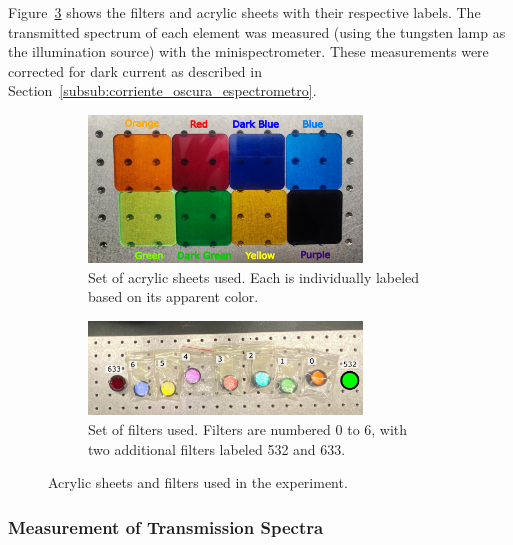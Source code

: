 \noindent Figure~\ref{fig:laminas_filtros} shows the filters and acrylic sheets with their respective labels. The transmitted spectrum of each element was measured (using the tungsten lamp as the illumination source) with the minispectrometer. These measurements were corrected for dark current as described in Section~\ref{subsub:corriente_oscura_espectrometro}.

\begin{figure}[H]
    \centering
    \begin{subfigure}{\textwidth}
        \centering
        \includegraphics[width=0.8\textwidth]{Figures/C3/laminas.pdf}
        \caption{Set of acrylic sheets used. Each is individually labeled based on its apparent color.}
        \label{fig:laminas}
    \end{subfigure}
    \vspace{1em}
    \begin{subfigure}{\textwidth}
        \centering
        \includegraphics[width=0.8\textwidth]{Figures/C3/filtros.pdf}
        \caption{Set of filters used. Filters are numbered 0 to 6, with two additional filters labeled 532 and 633.}
        \label{fig:filtros}
    \end{subfigure}
    \caption{Acrylic sheets and filters used in the experiment.}
    \label{fig:laminas_filtros}
\end{figure}

\subsubsection{Measurement of Transmission Spectra}
\label{subsub:medicion_transmision}

